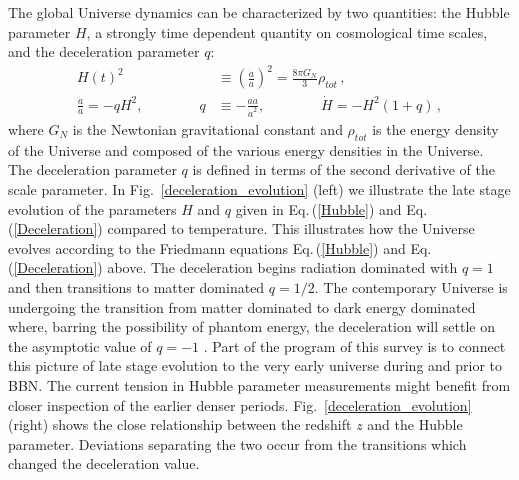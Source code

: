 \documentclass[universe,article,submit,moreauthors,pdftex,a4paper]{Definitions/mdpi}
\newcommand{\req}[1]{Eq.\,(\ref{#1})}
\newcommand*{\rf}[1]{Fig.~{\ref{#1}}}
\begin{document}
The global Universe dynamics can be characterized by two  quantities: the Hubble parameter  $H$, a strongly time dependent quantity on cosmological time scales,  and the deceleration parameter $q$:
\begin{align}
  \label{Hubble} H(t)^{2}&\equiv\left(\frac{\dot a}{a}\right)^2=\frac{8\pi G_{N}}{3}\rho_{tot}\,,\\
  \label{Deceleration} \frac{\ddot a}{a}=-qH^2,\qquad\qquad q&\equiv -\frac{a\ddot a}{\dot a^2},\qquad\qquad \dot H=-H^2(1+q)\,,    
\end{align}
where $G_{N}$ is the Newtonian gravitational constant and $\rho_{tot}$ is the energy density of the Universe and composed of the various energy densities in the Universe. The deceleration parameter $q$ is defined in terms of the second derivative of the scale parameter. In \rf{deceleration_evolution} (left) we illustrate the late stage evolution of the parameters $H$ and $q$ given in \req{Hubble} and \req{Deceleration} compared to temperature. This illustrates how the Universe evolves according to the Friedmann equations \req{Hubble} and \req{Deceleration} above. The deceleration begins radiation dominated with $q=1$ and then transitions to matter dominated $q=1/2$. The contemporary Universe is undergoing the transition from matter dominated to dark energy dominated where, barring the possibility of phantom energy, the deceleration will settle on the asymptotic value of $q=-1$ \cite{Rafelski:2013yka}. Part of the program of this survey is to connect this picture of late stage evolution to the very early universe during and prior to BBN. The current tension in Hubble parameter measurements \cite{Perivolaropoulos:2021jda,DiValentino:2021izs,Aluri:2022hzs}
might benefit from closer inspection of the earlier denser periods. \rf{deceleration_evolution} (right) shows the close relationship between the redshift $z$ and the Hubble parameter. Deviations separating the two occur from the transitions which changed the deceleration value.
\end{document}
